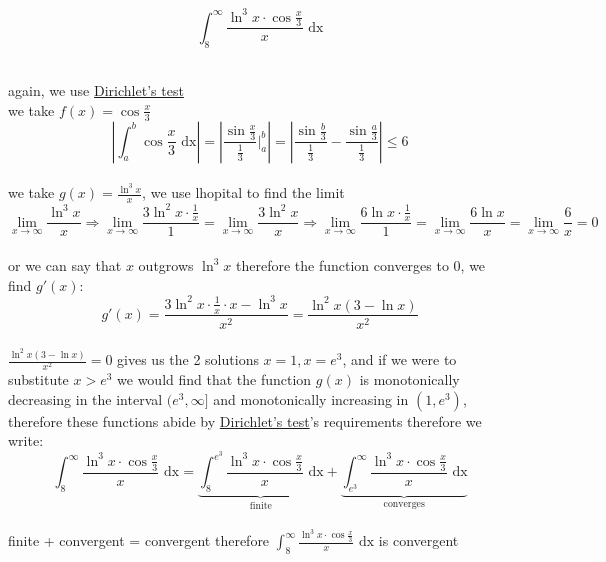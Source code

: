 \documentclass[a4paper,12pt]{article}
\newcommand{\?}{\stackrel{?}{=}}
\begin{document}
\begin{definition}
\begin{question}
\[
  \int_8^\infty \frac{\ln^3 x \cdot \cos\frac{x}{3}}{x} \text{ dx}
\]\\[0pt]
\begin{answer}
again, we use \hyperref[sec:org6f3d3ae]{Dirichlet's test}\\[0pt]
we take \(f(x) = \cos \frac{x}{3}\)\\[0pt]
\[
  \left|\int_a^b \cos \frac{x}{3} \text{ dx}\right| = \left|\frac{\sin \frac{x}{3}}{\frac13} \Bigg|_a^b\right| = \left|\frac{\sin \frac{b}{3}}{\frac13} - \frac{\sin \frac{a}{3}}{\frac13}\right| \leq 6
\]\\[0pt]
we take \(g(x) = \frac{\ln^3 x}{x}\), we use lhopital to find the limit\\[0pt]
\[
  \lim_{x\to\infty} \frac{\ln^3 x}{x} \Rightarrow \lim_{x\to\infty} \frac{3\ln^2 x \cdot \frac1x}{1} = \lim_{x\to\infty} \frac{3\ln^2 x}{x} \Rightarrow \lim_{x\to\infty} \frac{6\ln x \cdot \frac1x}{1} = \lim_{x\to\infty} \frac{6\ln x}{x} = \lim_{x\to\infty} \frac6x = 0
\]\\[0pt]
or we can say that \(x\) outgrows \(\ln^3 x\) therefore the function converges to 0, we find \(g'(x)\):\\[0pt]
\[
  g'(x) = \frac{3\ln^2 x \cdot \frac1x \cdot x - \ln^3 x}{x^2} = \frac{\ln^2 x(3-\ln x)}{x^2}
\]\\[0pt]
\(\frac{\ln^2 x(3-\ln x)}{x^2} = 0\) gives us the 2 solutions \(x=1,x=e^3\), and if we were to substitute \(x > e^3\) we would find that the function \(g(x)\) is monotonically decreasing in the interval \((e^3, \infty]\) and monotonically increasing in \((1,e^3)\), therefore these functions abide by \hyperref[sec:org6f3d3ae]{Dirichlet's test}'s requirements therefore we write:\\[0pt]
\[
  \int_8^\infty \frac{\ln^3 x \cdot \cos\frac{x}{3}}{x} \text{ dx} = \underbrace{\int_8^{e^3} \frac{\ln^3 x \cdot \cos\frac{x}{3}}{x} \text{ dx}}_{\text{finite}} + \underbrace{\int_{e^3}^{\infty} \frac{\ln^3 x \cdot \cos\frac{x}{3}}{x} \text{ dx}}_{\text{converges}}
\]\\[0pt]
finite + convergent = convergent therefore \(\int_8^\infty \frac{\ln^3 x \cdot \cos\frac{x}{3}}{x} \text{ dx}\) is convergent\\[0pt]
\end{answer}
\end{question}


\end{definition}
\end{document}
